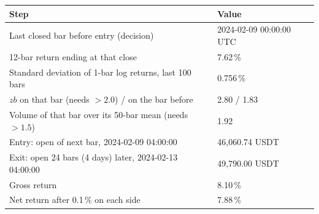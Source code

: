 \begin{tabular}{ll}\toprule Step & Value\\\midrule
Last closed bar before entry (decision) & 2024-02-09 00:00:00 UTC\\
12-bar return ending at that close & 7.62\,\%\\
Standard deviation of 1-bar log returns, last 100 bars & 0.756\,\%\\
$zb$ on that bar (needs $>2.0$) / on the bar before & 2.80 / 1.83\\
Volume of that bar over its 50-bar mean (needs $>1.5$) & 1.92\\
Entry: open of next bar, 2024-02-09 04:00:00 & 46,060.74 USDT\\
Exit: open 24 bars (4 days) later, 2024-02-13 04:00:00 & 49,790.00 USDT\\
Gross return & 8.10\,\%\\
Net return after 0.1\,\% on each side & 7.88\,\%\\\bottomrule\end{tabular}
